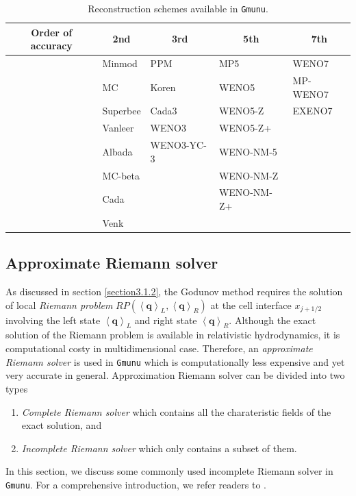 \begin{table}[h]
	\centering
	\caption{\label{tab:limiters}Reconstruction schemes available in \texttt{Gmunu}.}
	\begin{tabular}{ l | l | l | l | l }
		\multicolumn{1}{c|}{ Order of accuracy } & \multicolumn{1}{c|}{ 2nd } & \multicolumn{1}{c|}{ 3rd } & \multicolumn{1}{c|}{ 5th } & \multicolumn{1}{c}{ 7th }\\ \hline
		  & Minmod \cite{ziegler2011semi,kolgan1972application,van1979towards} 
          & PPM \cite{colella1984piecewise} & MP5 \cite{suresh1997accurate} & WENO7\\
		  & MC \cite{van1974towards} & Koren & WENO5 & MP-WENO7 \\
		  & Superbee \cite{roe1986characteristic} & Cada3 & WENO5-Z & EXENO7 \\
		  & Vanleer \cite{van1977towards} & WENO3 & WENO5-Z+ &  \\
		  & Albada & WENO3-YC-3 & WENO-NM-5 &  \\
		  & MC-beta &  & WENO-NM-Z &  \\
		  & Cada &  & WENO-NM-Z+ &  \\
		  & Venk &  &  &  \\
	\end{tabular}
\end{table}

\subsection{Approximate Riemann solver}
As discussed in section \ref{section3.1.2},
the Godunov method requires the solution of local \textit{Riemann problem }
$RP\left(\left\langle \mathbf{q} \right\rangle_{L}, \left\langle \mathbf{q} \right\rangle_{R} \right)$
at the cell interface $x_{j+1/2}$ involving the left state $\left\langle \mathbf{q} \right\rangle_{L}$
and right state $\left\langle \mathbf{q} \right\rangle_{R}$.
Although the exact solution of the Riemann problem is available in relativistic hydrodynamics,
it is computational costy in multidimensional case.
Therefore, an \textit{approximate Riemann solver} is used in \texttt{Gmunu}
which is computationally less expensive and yet very accurate in general.
Approximation Riemann solver can be divided into two types
\begin{enumerate}[label=(\roman*)]
    \item \textit{Complete Riemann solver} which contains all the charateristic fields of the exact solution, and
    \item \textit{Incomplete Riemann solver} which only contains a subset of them.
\end{enumerate}
In this section, we discuss some commonly used incomplete Riemann solver in \texttt{Gmunu}.
For a comprehensive introduction, we refer readers to \cite{toro2013riemann}.

